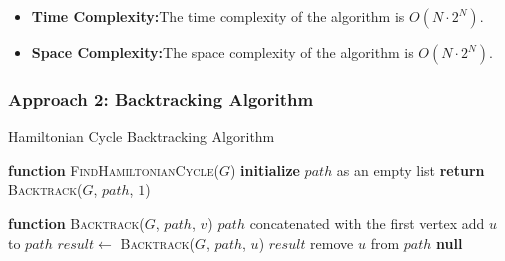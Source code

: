 \documentclass[14pt, times, a4paper]{extarticle}
\begin{document}
\begin{itemize}
    \item {\textbf{Time Complexity:}The time complexity of the algorithm is $O(N \cdot 2^N)$.}
    \item {\textbf{Space Complexity:}The space complexity of the algorithm is $O(N \cdot 2^N)$.}
\end{itemize}

\clearpage
\subsubsection{Approach 2: Backtracking Algorithm}

\begin{algorithm}
\caption{Hamiltonian Cycle Backtracking Algorithm}
\begin{algorithmic}[1]
\STATE \textbf{function} \textsc{FindHamiltonianCycle}($G$)
\STATE \quad \textbf{initialize} $path$ as an empty list
\STATE \quad \textbf{return} \textsc{Backtrack}($G$, $path$, $1$)

\STATE

\STATE \textbf{function} \textsc{Backtrack}($G$, $path$, $v$)
\RETURN $path$ concatenated with the first vertex
\ENDIF
{}
\STATE add $u$ to $path$
\STATE $result \leftarrow$ \textsc{Backtrack}($G$, $path$, $u$) 
\RETURN $result$
\ENDIF
\STATE remove $u$ from $path$ 
\ENDIF
\ENDFOR
\RETURN \textbf{null}
\end{algorithmic}
\end{algorithm}
\cite{cormen2009introduction}
\end{document}
